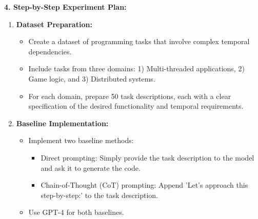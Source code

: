 \begin{tcolorbox}[colback=blue!5!white,colframe=blue!75!black,title=\textbf{Temporal Dependency Unfolding: Improving Code Generation for Complex Stateful Systems (Part 1)}]
{\textbf{4. Step-by-Step Experiment Plan:}
\begin{enumerate}
    \item \textbf{Dataset Preparation:}
    \begin{itemize}
        \item Create a dataset of programming tasks that involve complex temporal dependencies.
        \item Include tasks from three domains: 1) Multi-threaded applications, 2) Game logic, and 3) Distributed systems.
        \item For each domain, prepare 50 task descriptions, each with a clear specification of the desired functionality and temporal requirements.
    \end{itemize}
    \item \textbf{Baseline Implementation:}
    \begin{itemize}
        \item Implement two baseline methods:
        \begin{itemize}
            \item Direct prompting: Simply provide the task description to the model and ask it to generate the code.
            \item Chain-of-Thought (CoT) prompting: Append 'Let's approach this step-by-step:' to the task description.
        \end{itemize}
        \item Use GPT-4 for both baselines.
    \end{itemize}
\end{enumerate}
}
\end{tcolorbox}

\newpage



